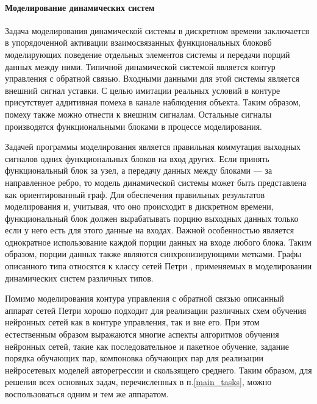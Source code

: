 \paragraph{Моделирование динамических систем}

Задача моделирования динамической системы в дискретном времени
заключается в упорядоченной активации взаимосвязанных функциональных
блоковб моделирующих поведение отдельных элементов системы и передачи
порций данных между ними.  Типичной динамической системой является
контур управления с обратной связью.  Входными данными для этой
системы является внешний сигнал уставки.  С целью имитации реальных
условий в контуре присутствует аддитивная помеха в канале наблюдения
объекта.  Таким образом, помеху также можно отнести к внешним
сигналам.  Остальные сигналы производятся функциональными блоками в
процессе моделирования.

Задачей программы моделирования является правильная коммутация
выходных сигналов одних функциональных блоков на вход других.  Если
принять функциональный блок за узел, а передачу данных между блоками
--- за направленное ребро, то модель динамической системы может быть
представлена как ориентированный граф.  Для обеспечения правильных
результатов моделирования и, учитывая, что оно происходит в дискретном
времени, функциональный блок должен вырабатывать порцию выходных
данных только если у него есть для этого данные на входах.  Важной
особенностью является однократное использование каждой порции данных
на входе любого блока.  Таким образом, порции данных также являются
синхронизирующими метками.  Графы описанного типа относятся к классу
сетей Петри \cite{petri_network}\cite{makloh01}, применяемых в моделировании
динамических систем различных типов.

Помимо моделирования контура управления с обратной связью описанный
аппарат сетей Петри хорошо подходит для реализации различных схем
обучения нейронных сетей как в контуре управления, так и вне его.  При
этом естественным образом выражаются многие аспекты алгоритмов
обучения нейронных сетей, такие как последовательное и пакетное
обучение, задание порядка обучающих пар, компоновка обучающих пар для
реализации нейросетевых моделей авторегрессии и скользящего среднего.
Таким образом, для решения всех основных задач, перечисленных в
п.\ref{main_tasks}, можно воспользоваться одним и тем же аппаратом.

